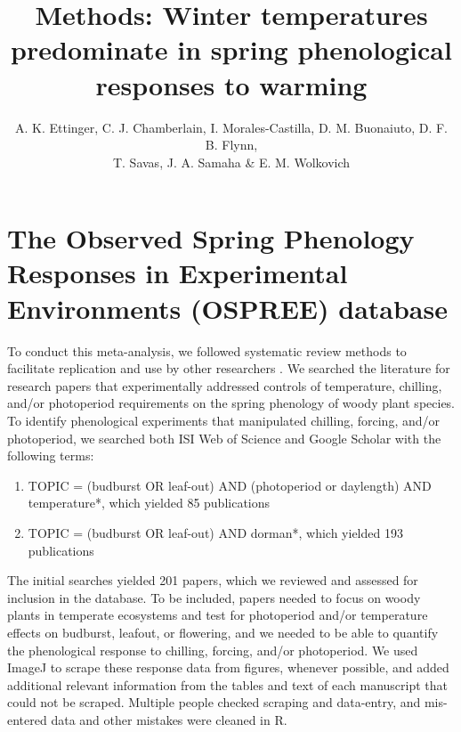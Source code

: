 \documentclass{article}
\begin{document}

\title{Methods:  Winter temperatures predominate in spring phenological responses to warming} 

\author{A. K. Ettinger, C. J. Chamberlain, I. Morales-Castilla, D. M. Buonaiuto, D. F. B. Flynn, \\ T. Savas, J. A. Samaha \& E. M. Wolkovich}
\date{} 
\maketitle  %
\section*{The Observed Spring Phenology Responses in Experimental Environments (OSPREE) database}
\par To conduct this meta-analysis, we followed systematic review methods to facilitate replication and use by other researchers \emph{\citep[e.g., {\normalfont we include at least 22/27 items on the PRISMA checklist, as summarized in Appendix 1,}][]{moher2009}}. We searched the literature for research papers that experimentally addressed controls of temperature, chilling, and/or photoperiod requirements on the spring phenology of woody plant species. To identify phenological experiments that manipulated chilling, forcing, and/or photoperiod, we searched both ISI Web of Science and Google Scholar with the following terms: 
\begin{enumerate}
\item TOPIC = (budburst OR leaf-out) AND (photoperiod or daylength) AND temperature*, which yielded 85 publications

\item TOPIC = (budburst OR leaf-out) AND dorman*, which yielded 193 publications
\end{enumerate}



The initial searches yielded 201 papers, which we reviewed and assessed for inclusion in the database. To be included, papers needed to focus on woody plants in temperate ecosystems and test for photoperiod and/or temperature effects on budburst, leafout, or flowering, and we needed to be able to quantify the phenological response to chilling, forcing, and/or photoperiod. We used ImageJ to scrape these response data from figures, whenever possible, and added additional relevant information from the tables and text of each manuscript that could not be scraped. Multiple people checked scraping and data-entry, and mis-entered data and other mistakes were cleaned in R.
\end{document}
